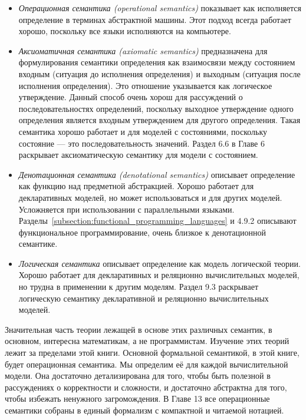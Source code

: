 \begin{itemize}
\item{\emph{Операционная семантика (operational semantics)} показывает как исполняется определение в терминах абстрактной машины. Этот подход всегда работает хорошо, поскольку все языки исполняются на компьютере.}

\item{\emph{Аксиоматичная семантика (axiomatic semantics)} предназначена для формулирования семантики определения как взаимосвязи между состоянием входным (ситуация до исполнения определения) и выходным (ситуация после исполнения определения). Это отношение указывается как логическое утверждение. Данный способ очень хорош для рассуждений о последовательностях определений, поскольку выходное утверждение одного определения является входным утверждением для другого определения. Такая семантика хорошо работает и для моделей с состояниями, поскольку состояние --- это последовательность значений. Раздел 6.6 в Главе 6 раскрывает аксиоматическую семантику для модели с состоянием.}

\item{\emph{Денотационная семантика (denotational semantics)} описывает определение как функцию над предметной абстракцией. Хорошо работает для декларативных моделей, но может использоваться и для других моделей. Усложняется при использовании с параллельными языками. Разделы~\ref{subsection:functional_programming_languages} и 4.9.2 описывают функциональное программирование, очень близкое к денотационной семантике.}

\item{\emph{Логическая семантика} описывает определение как модель логической теории. Хорошо работает для декларативных и реляционно вычислительных моделей, но трудна в применении к другим моделям. Раздел 9.3 раскрывает логическую семантику декларативной и реляционно вычислительных моделей.}
\end{itemize}

Значительная часть теории лежащей в основе этих различных семантик, в основном, интересна математикам, а не программистам. Изучение этих теорий лежит за пределами этой книги. Основной формальной семантикой, в этой книге, будет операционная семантика. Мы определим её для каждой вычислительной модели. Она достаточно детализирована для того, чтобы быть полезной в рассуждениях о корректности и сложности, и достаточно абстрактна для того, чтобы избежать ненужного загромождения. В Главе 13 все операционные семантики собраны в единый формализм с компактной и читаемой нотацией.

